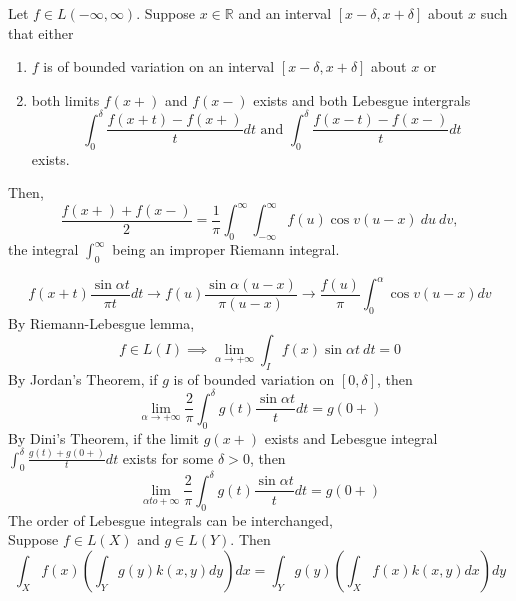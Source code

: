 \begin{theorem}
	Let \(f \in L(-\infty,\infty)\).
	Suppose \(x \in \mathbb{R}\) and an interval $[x-\delta,x+\delta]$ about $x$ such that either 
	\begin{enumerate}
		\item $f$ is of bounded variation on an interval $[x-\delta,x+\delta]$ about $x$ or
		\item both limits $f(x+)$ and $f(x-)$ exists and both Lebesgue intergrals
			\[ \int_0^\delta \frac{f(x+t)-f(x+)}{t} dt \text{ and }\int_0^\delta \frac{f(x-t)-f(x-)}{t} dt \]
			exists.
	\end{enumerate}
	Then, 
	\[ \frac{f(x+)+f(x-)}{2} = \frac{1}{\pi} \int_0^\infty \int_{-\infty}^\infty f(u)\cos v(u-x)\ du\ dv, \]
	the integral $\int_0^\infty$ being an improper Riemann integral.
\end{theorem}
\begin{synopsis}
	\[ f(x+t)\frac{\sin \alpha t}{\pi t} dt \to f(u)\frac{\sin \alpha(u-x)}{\pi(u-x)} \to \frac{f(u)}{\pi} \int_0^\alpha \cos v(u-x) dv \]
	By Riemann-Lebesgue lemma\cite[Theorem 11.6]{apostol},
	\[ f \in L(I) \implies \lim_{\alpha \to +\infty} \int_I f(x) \sin \alpha t\ dt = 0 \]
	By Jordan's Theorem\cite[Theorem 10.8]{apostol}, if $g$ is of bounded variation on $[0,\delta]$, then
	\[ \lim_{\alpha \to +\infty} \frac{2}{\pi} \int_0^\delta g(t) \frac{\sin \alpha t}{t} dt = g(0+) \]
	By Dini's Theorem\cite[Theorem 10.9]{apostol}, if the limit $g(x+)$ exists and Lebesgue integral \( \int_0^\delta \frac{g(t)+g(0+)}{t} dt \) exists for some \( \delta > 0 \), then
	\[ \lim_{\alpha to +\infty} \frac{2}{\pi} \int_0^\delta g(t) \frac{\sin \alpha t}{t} dt = g(0+) \]
	The order of Lebesgue integrals can be interchanged\cite[Theorem 10.40]{apostol},\\
	Suppose \(f \in L(X)\) and \(g \in L(Y)\).
	Then
	\[ \int_X f(x) \left(\int_Y g(y) k(x,y) dy \right) dx = \int_Y g(y) \left( \int_X f(x) k(x,y) dx \right) dy \]
\end{synopsis}
